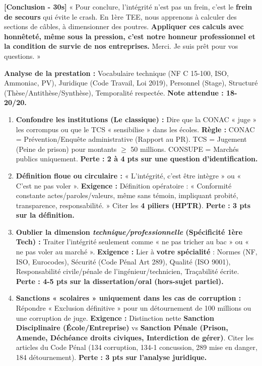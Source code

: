 \documentclass[11pt]{article}
\newcommand{\cle}[1]{{\popxbold\color{popdark}#1}}
\begin{document}
\begin{exoresolu}
    \textbf{[Conclusion - 30s]} « Pour conclure, l'intégrité n'est pas un frein, c'est le \textbf{frein de secours} qui évite le crash. En 1ère TEE, nous apprenons à calculer des sections de câbles, à dimensionner des poutres. \textbf{Appliquer ces calculs avec honnêteté, même sous la pression, c'est notre honneur professionnel et la condition de survie de nos entreprises.} Merci. Je suis prêt pour vos questions. »

    \textbf{Analyse de la prestation :} Vocabulaire technique (NF C 15-100, ISO, Ammoniac, PV), Juridique (Code Travail, Loi 2019), Personnel (Stage), Structuré (Thèse/Antithèse/Synthèse), Temporalité respectée. \textbf{Note attendue : 18-20/20.}
\end{exoresolu}

\begin{attention}
    \begin{enumerate}
        \item \textbf{Confondre les institutions (Le classique) :} Dire que la \cle{CONAC} « juge » les corrompus ou que le \cle{TCS} « sensibilise » dans les écoles. \textbf{\rightarrow Règle :} CONAC = Prévention/Enquête administrative (Rapport au PR). TCS = Jugement (Peine de prison) pour montants $\ge$ 50 millions. CONSUPE = Marchés publics uniquement. \textbf{Perte : 2 à 4 pts sur une question d'identification.}
        \item \textbf{Définition floue ou circulaire :} « L'intégrité, c'est être intègre » ou « C'est ne pas voler ». \textbf{\rightarrow Exigence :} Définition opératoire : « Conformité constante actes/paroles/valeurs, même sans témoin, impliquant probité, transparence, responsabilité. » Citer les \textbf{4 piliers (HPTR)}. \textbf{Perte : 3 pts sur la définition.}
        \item \textbf{Oublier la dimension \emph{technique/professionnelle} (Spécificité 1ère Tech) :} Traiter l'intégrité seulement comme « ne pas tricher au bac » ou « ne pas voler au marché ». \textbf{\rightarrow Exigence :} Lier à \textbf{votre spécialité} : Normes (NF, ISO, Eurocodes), Sécurité (Code Pénal Art 289), Qualité (ISO 9001), Responsabilité civile/pénale de l'ingénieur/technicien, Traçabilité écrite. \textbf{Perte : 4-5 pts sur la dissertation/oral (hors-sujet partiel).}
        \item \textbf{Sanctions « scolaires » uniquement dans les cas de corruption :} Répondre « Exclusion définitive » pour un détournement de 100 millions ou une corruption de juge. \textbf{\rightarrow Exigence :} Distinction nette \textbf{Sanction Disciplinaire (École/Entreprise)} vs \textbf{Sanction Pénale (Prison, Amende, Déchéance droits civiques, Interdiction de gérer)}. Citer les articles du Code Pénal (134 corruption, 134-1 concussion, 289 mise en danger, 184 détournement). \textbf{Perte : 3 pts sur l'analyse juridique.}

\end{enumerate}
\end{attention}
\end{document}
